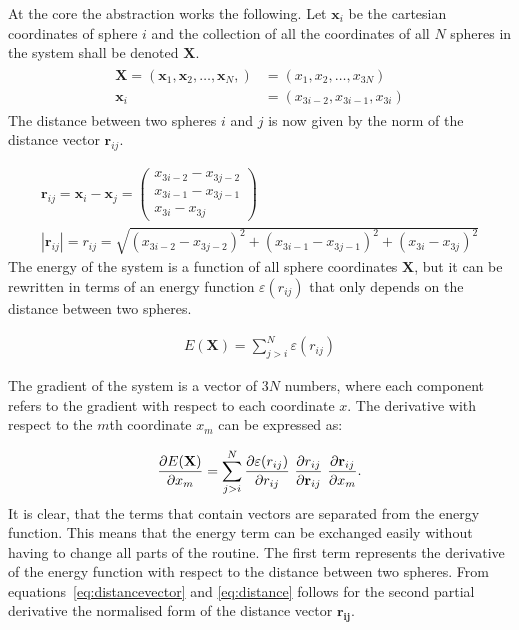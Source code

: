 At the core the abstraction works the following. Let $\mathbf{x}_i$ be the
cartesian coordinates of sphere $i$ and the collection of all the coordinates
of all $N$ spheres in the system shall be denoted $\mathbf{X}$.
%
\begin{align}
    \begin{aligned}
        \mathbf{X}=(\mathbf{x}_1,\mathbf{x}_2,\ldots,\mathbf{x}_N,)&=(x_1,x_2,\ldots,x_{3N}) \\
            \mathbf{x}_i &= (x_{3i-2},x_{3i-1},x_{3i})
    \end{aligned}
\end{align}%
%
The distance between two spheres $i$ and $j$ is now given by the norm of the
distance vector $\mathbf{r}_{ij}$.

\begin{align}
    \mathbf{r}_{ij}=\mathbf{x}_i-\mathbf{x}_j=
    \begin{pmatrix}
        x_{3i-2} - x_{3j-2}\\
        x_{3i-1} - x_{3j-1}\\
        x_{3i} - x_{3j}
    \end{pmatrix}\label{eq:distancevector}\\
    |\mathbf{r}_{ij}|=r_{ij}=\sqrt{(x_{3i-2} - x_{3j-2})^2 + (x_{3i-1} - x_{3j-1})^2 + (x_{3i} - x_{3j})^2}\label{eq:distance}
\end{align}
%
The energy of the system is a function of all sphere coordinates $\mathbf{X}$,
but it can be rewritten in terms of an energy function $\varepsilon(r_{ij})$ that only depends on the
distance between two spheres.

\begin{align}
    E(\mathbf{X})=\sum_{j>i}^N\varepsilon(r_{ij})
\end{align}%
%

The gradient of the system is a vector of $3N$ numbers, where each component
refers to the gradient with respect to each coordinate $x$. The derivative with
respect to the $m$th coordinate $x_m$ can be expressed as:

\begin{align}
    \pdv{E(\mathbf{X})}{x_m}=\sum_{j>i}^N\pdv{\varepsilon(r_{ij})}{r_{ij}}\ \pdv{r_{ij}}{\mathbf{r}_{ij}}\ \pdv{\mathbf{r}_{ij}}{x_m}.\label{eq:gradientcomponent}
\end{align}%
%
It is clear, that the terms that contain vectors are separated from the energy
function. This means that the energy term can be exchanged easily without
having to change all parts of the routine. The first term represents the
derivative of the energy function with respect to the distance between two
spheres. From equations~\eqref{eq:distancevector} and \eqref{eq:distance}
follows for the second partial derivative the normalised form of the distance
vector $\mathbf{r_{ij}}$.


